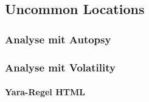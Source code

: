 \subsection*{Uncommon Locations}

\subsubsection*{Analyse mit Autopsy}

\subsubsection*{Analyse mit Volatility}

\paragraph*{Yara-Regel \glqq{}HTML\grqq{}}

